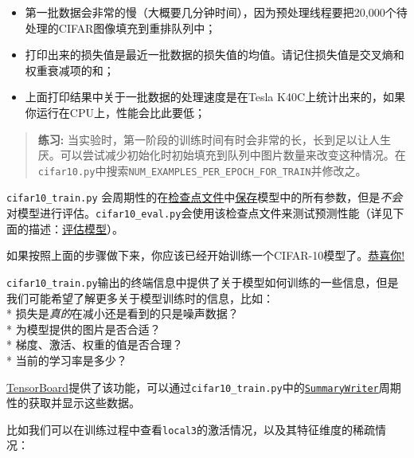 \begin{itemize}
\item
  第一批数据会非常的慢（大概要几分钟时间），因为预处理线程要把20,000个待处理的CIFAR图像填充到重排队列中；
\item
  打印出来的损失值是最近一批数据的损失值的均值。请记住损失值是交叉熵和权重衰减项的和；
\item
  上面打印结果中关于一批数据的处理速度是在Tesla
  K40C上统计出来的，如果你运行在CPU上，性能会比此要低；
\end{itemize}

\begin{quote}
\textbf{练习:}
当实验时，第一阶段的训练时间有时会非常的长，长到足以让人生厌。可以尝试减少初始化时初始填充到队列中图片数量来改变这种情况。在\texttt{cifar10.py}中搜索\texttt{NUM\_EXAMPLES\_PER\_EPOCH\_FOR\_TRAIN}并修改之。
\end{quote}

\texttt{cifar10\_train.py}
会周期性的在\href{https://github.com/jikexueyuanwiki/tensorflow-zh/tree/master/SOURCE/how_tos/variables/index.md\#saving-and-restoring}{检查点文件}中\href{https://github.com/jikexueyuanwiki/tensorflow-zh/blob/master/SOURCE/api_docs/python/state_ops.md\#Saver}{保存}模型中的所有参数，但是\emph{不会}对模型进行评估。\texttt{cifar10\_eval.py}会使用该检查点文件来测试预测性能（详见下面的描述：\protect\hyperlink{ux8bc4ux4f30ux6a21ux578b}{评估模型}）。

如果按照上面的步骤做下来，你应该已经开始训练一个CIFAR-10模型了。\href{https://www.youtube.com/watch?v=9bZkp7q19f0}{恭喜你!}

\texttt{cifar10\_train.py}输出的终端信息中提供了关于模型如何训练的一些信息，但是我们可能希望了解更多关于模型训练时的信息，比如：\\
* 损失是\emph{真的}在减小还是看到的只是噪声数据？\\
* 为模型提供的图片是否合适？\\
* 梯度、激活、权重的值是否合理？\\
* 当前的学习率是多少？

\href{https://github.com/jikexueyuanwiki/tensorflow-zh/tree/master/SOURCE/how_tos/summaries_and_tensorboard/index.md}{TensorBoard}提供了该功能，可以通过\texttt{cifar10\_train.py}中的\href{https://github.com/jikexueyuanwiki/tensorflow-zh/blob/master/SOURCE/api_docs/python/train.md\#SummaryWriter}{\texttt{SummaryWriter}}周期性的获取并显示这些数据。

比如我们可以在训练过程中查看\texttt{local3}的激活情况，以及其特征维度的稀疏情况：


